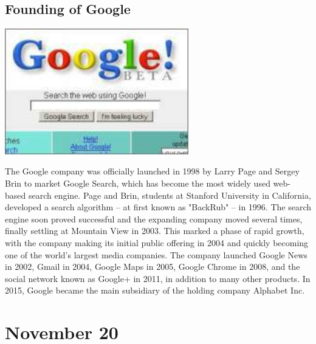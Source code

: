 \documentclass[11pt]{report}
\begin{document}
\subsection{Founding of Google}
\vspace{2mm}\begin{center}\includegraphics[width=8cm]{./img/googlebeta.jpg}\end{center}
The Google company was officially launched in 1998 by Larry Page and Sergey Brin to market Google Search, which has become the most widely used web-based search engine. Page and Brin, students at Stanford University in California, developed a search algorithm – at first known as "BackRub" – in 1996. The search engine soon proved successful and the expanding company moved several times, finally settling at Mountain View in 2003. This marked a phase of rapid growth, with the company making its initial public offering in 2004 and quickly becoming one of the world's largest media companies. The company launched Google News in 2002, Gmail in 2004, Google Maps in 2005, Google Chrome in 2008, and the social network known as Google+ in 2011, in addition to many other products. In 2015, Google became the main subsidiary of the holding company Alphabet Inc.
\section{November 20}
\end{document}
